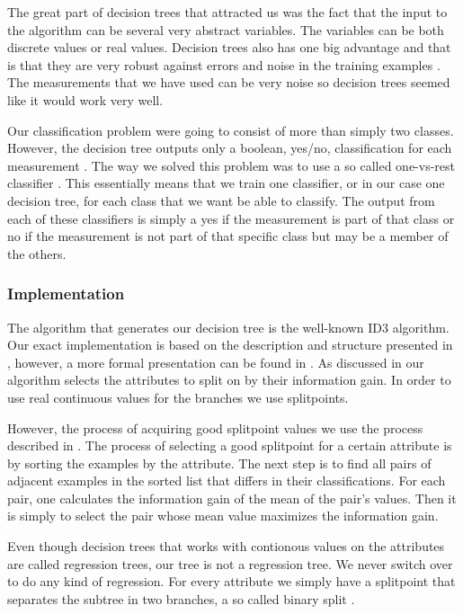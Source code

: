 \documentclass[a4paper, 10pt, conference]{ieeeconf}      %
\begin{document}
The great part of decision trees that attracted us was the fact that the input to the algorithm can be several very abstract variables. The variables can be both discrete values or real values. Decision trees also has one big advantage and that is that they are very robust against errors and noise in the training examples \cite{ml3}. The measurements that we have used can be very noise so decision trees seemed like it would work very well.

Our classification problem were going to consist of more than simply two classes. However, the decision tree outputs only a boolean, yes/no, classification for each measurement \cite{ml3}. The way we solved this problem was to use a so called one-vs-rest classifier \cite{praml}. This essentially means that we train one classifier, or in our case one decision tree, for each class that we want be able to classify. The output from each of these classifiers is simply a yes if the measurement is part of that class or no if the measurement is not part of that specific class but may be a member of the others.

\subsubsection{Implementation}
The algorithm that generates our decision tree is the well-known ID3 algorithm. Our exact implementation is based on the description and structure presented in \cite{aima}, however, a more formal presentation can be found in \cite{ml3}. As discussed in \cite{aima} our algorithm selects the attributes to split on by their information gain. In order to use real continuous values for the branches we use splitpoints.

However, the process of acquiring good splitpoint values we use the process described in \cite{ml3}. The process of selecting a good splitpoint for a certain attribute is by sorting the examples by the attribute. The next step is to find all pairs of adjacent examples in the sorted list that differs in their classifications. For each pair, one calculates the information gain of the mean of the pair's values. Then it is simply to select the pair whose mean value maximizes the information gain.

Even though decision trees that works with contionous values on the attributes are called regression trees, our tree is not a regression tree. We never switch over to do any kind of regression. For every attribute we simply have a splitpoint that separates the subtree in two branches, a so called binary split \cite{aima}.
\end{document}
